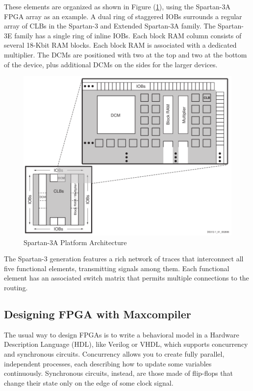 These elements are organized as shown in Figure (\ref{fig:spartan_arch}),
using the Spartan-3A FPGA
array as an example. A dual ring of staggered IOBs surrounds a regular
array of CLBs in the Spartan-3 and Extended Spartan-3A family. The
Spartan-3E family has a single ring of inline IOBs. Each block RAM column
consists of several 18-Kbit RAM blocks. Each block RAM is associated with a
dedicated multiplier. The DCMs are positioned with two at the top and two
at the bottom of the device, plus additional DCMs on the sides for the
larger devices.

\begin{figure}[h]
  \centering
  \includegraphics[scale=0.3]{img/spartan_arch.png}
  \caption{Spartan-3A Platform Architecture}
  \label{fig:spartan_arch}
\end{figure}

The Spartan-3 generation features a rich network of traces that
interconnect all five functional elements, transmitting signals among them.
Each functional element has an associated switch matrix that permits
multiple connections to the routing\cite{fpgaug}.

\subsection{Designing FPGA with Maxcompiler}

The usual way to design FPGAs is to write a behavioral model in
a Hardware Description Language (HDL), like Verilog or VHDL, which
supports concurrency and synchronous circuits. Concurrency allows
you to create fully parallel, independent processes, each describing
how to update some variables continuously. Synchronous circuits, instead,
are those made of flip-flops that change their state only on the edge
of some clock signal.

